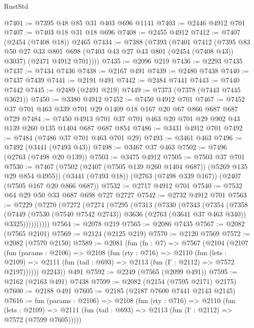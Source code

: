 \begin{lexlean}{RustStd}
\begin{coremodule}
@7401 := @7395 @48 @85 @31 @403 @696 @1141
@7403 := @2446 @4912 @701
@7407 := @7403 @18 @31 @18 @696
@7408 := @2455 @4912
@7412 := @7407 (@2454 (@7408 @18)) @2465
@7434 := @7388
    (@7393
      (@7401
        @7412
        (@7395
          @83
          @50
          @27
          @33
          @801
          @698
          (@7403 @43 @27 @43 @801 (@2454 (@7408 @43)) @3037)
          (@2471 @4912 @701))))
@7435 := @2096 @219
@7436 := @2293 @7435
@7437 := @7434 @7436
@7438 := @2167 @491
@7439 := @2480 @7438
@7440 := @7437 @7439
@7441 := @2191 @491
@7442 := @2484 @7441
@7443 := @7440 @7442
@7445 := @2489 (@2491 @219)
@7449 := @7373 (@7378 (@7443 @7445 @3621))
@7450 := @3380 @4912
@7452 := @7450 @4912 @701
@7467 := @7452 @37 @701 @463 @339 @701 @29 @1409 @18 @167 @20 @67 @866 @687 @687 @729
@7484 := @7450 @4913 @701 @37 @701 @463 @20 @701 @29 @902 @43 @139 @260 @135 @1404 @687 @687 @854
@7486 := @3431 @4912 @701
@7492 := @7484 (@7486 @37 @701 @463 @701 @29)
@7493 := @3461 @463
@7496 := @7492 (@3441 (@7493 @43))
@7498 := @3467 @37 @463
@7502 := @7496 (@2763 (@7498 @20 @139))
@7503 := @3475 @4912
@7505 := @7503 @37 @701
@7530 := @7467
    (@7502 (@2407 (@7505 @139 @260 @1404 @687)) (@5269 @135 @29 @854 @4955))
    (@3441 (@7493 @18))
    (@2763 (@7498 @339 @167))
    (@2407 (@7505 @167 @20 @866 @687))
@7532 := @2717 @4912 @701
@7540 := @7532 @64 @29 @50 @33 @687 @698 @727 @2727
@7542 := @2732 @4912 @701
@7563 := @7229
    (@7270
      (@7272
        (@7274
          (@7295
            (@7313
              (@7330
                (@7343
                  (@7354
                    (@7358
                      (@7449
                        (@7530 (@7540 @7542 @2743))
                        @3636
                        (@2763 (@3641 @37 @463 @340))
                        @3325))))))))))
@7564 := @2078 @219
@7565 := @2086 @7435
@7567 := @2082 (@7565 @2101)
@7569 := @2124 (@2125 @219)
@7570 := @2120 @7569
@7572 := @2082 (@7570 @2150)
@7589 := @2081
    (fun (fn : @7) =>
    @7567
      (@2104
        (@2107
          (fun (params : @2106) =>
          @2108
            (fun (rty : @716) =>
            @2110
              (fun (lets : @2109) =>
              @2111 (fun (tail : @693) => @2113 (fun (Γ : @2112) => @7572 @2197))))))
        @2243))
    @491
@7592 := @2249 (@7565 (@2099 @491))
@7595 := @2162 (@2163 @491) @7438
@7599 := @2082 (@2154 (@7595 @2171) @2175)
@7600 := @2188 @491
@7605 := @2185 (@2187 @7600 @7441 @2143 @2145)
@7616 := fun (params : @2106) =>
  @2108
    (fun (rty : @716) =>
    @2110
      (fun (lets : @2109) =>
      @2111 (fun (tail : @693) => @2113 (fun (Γ : @2112) => @7572 (@7599 @7605)))))

\end{coremodule}
\end{lexlean}
